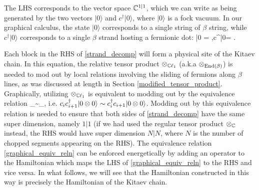 The LHS corresponds to the vector space $\mathbb{C}^{1|1}$, which we can write as being generated by the two vectors $|0\rangle$ and $c^\dagger |0\rangle$, where $|0\rangle$ is a fock vacuum. 
In our graphical calculus, the state $|0\rangle$ corresponds to a single string of $\beta$ string, while $c^\dagger|0\rangle$ corresponds to a single $\beta$ strand hosting a fermionic dot:
\be |0\rangle \; = \; \horizbeta\;,\qquad c^\dagger|0\rangle = \; \horizbetadot\;.\ee

Each block in the RHS of \eqref{strand_decomp} will form a physical site of the Kitaev chain. 
In this equation, the relative tensor product $\otimes_{\mathbb{C}\ell_1}$ (a.k.a $\otimes_{\text{End}(\beta)}$) is needed to mod out by local relations involving the sliding of fermions along $\beta$ lines, as was discussed at length in Section \ref{modified_tensor_product}. 
Graphically, utilizing $\otimes_{\mathbb{C}\ell_1}$ is equivalent to modding out by the equivalence relation 
\be\label{graphical_equiv_reln} \horizbeta \tp_\cc \horizbetadot \sim \horizbetadot \tp_\cc \horizbeta,\ee
i.e. $c_i c_{i+1}^\dagger |0\otimes 0\rangle \sim c_i^\dagger c_{i+1}|0\otimes0\rangle$. 
Modding out by this equivalence relation is needed to ensure that both sides of \eqref{strand_decomp} have the same super dimension, namely $1|1$ (if we had used the regular tensor product $\otimes_{\mathbb{C}}$ instead, the RHS would have super dimension $N|N$, where $N$ is the number of chopped segments appearing on the RHS). 
The equivalence relation \eqref{graphical_equiv_reln} can be enforced energetically by adding an operator 
to the Hamiltonian which maps the LHS of \eqref{graphical_equiv_reln} to the RHS and vice versa. 
In what follows, we will see that the Hamiltonian constructed in this way is precisely the Hamiltonian of the Kitaev chain. 

